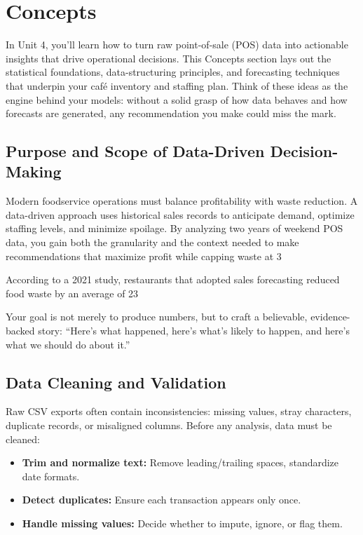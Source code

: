 
\section{Concepts}
\label{sec:unit4_concepts}

In Unit 4, you’ll learn how to turn raw point-of-sale (POS) data into actionable insights that drive operational decisions. This Concepts section lays out the statistical foundations, data-structuring principles, and forecasting techniques that underpin your café inventory and staffing plan. Think of these ideas as the engine behind your models: without a solid grasp of how data behaves and how forecasts are generated, any recommendation you make could miss the mark.

\subsection{Purpose and Scope of Data-Driven Decision-Making}
Modern foodservice operations must balance profitability with waste reduction. A data-driven approach uses historical sales records to anticipate demand, optimize staffing levels, and minimize spoilage. By analyzing two years of weekend POS data, you gain both the granularity and the context needed to make recommendations that maximize profit while capping waste at 3 %

\begin{Trivia}
According to a 2021 study, restaurants that adopted sales forecasting reduced food waste by an average of 23 %
\end{Trivia}

Your goal is not merely to produce numbers, but to craft a believable, evidence-backed story: “Here’s what happened, here’s what’s likely to happen, and here’s what we should do about it.”

\subsection{Data Cleaning and Validation}
Raw CSV exports often contain inconsistencies: missing values, stray characters, duplicate records, or misaligned columns. Before any analysis, data must be cleaned:

\begin{itemize}
  \item \textbf{Trim and normalize text:} Remove leading/trailing spaces, standardize date formats.
  \item \textbf{Detect duplicates:} Ensure each transaction appears only once.
  \item \textbf{Handle missing values:} Decide whether to impute, ignore, or flag them.
\end{itemize}


